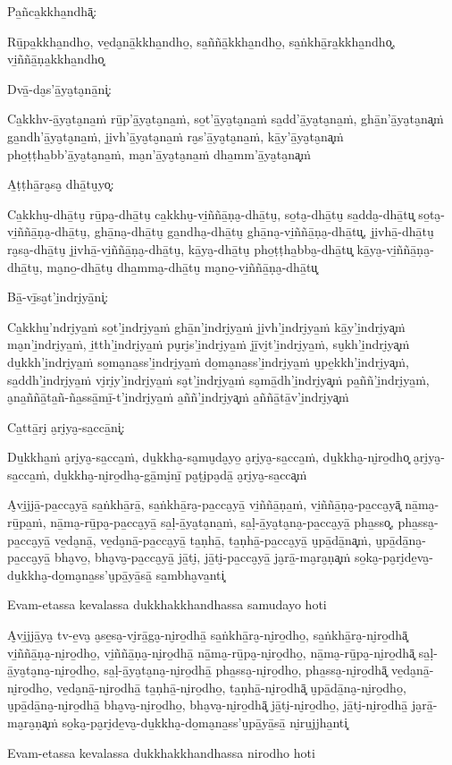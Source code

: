 \begin{paritta}

Pa̱ñca̱kkha̱ndhā͓:

Rū̱pa̱kkha̱ndho̱, ve̱da̮nā̱kkha̱ndho̱, sa̱ññā̱kkha̱ndho̱, sa̱ṅkhā̱ra̱kkha̱ndho͓,
vi̱ññā̱ṇa̱kkha̱ndho͓

Dvā̱-da̮s'ā̱ya̮ta̮nā̱ni͓:

Ca̱kkhv-ā̱ya̮ta̮na̱ṁ rū̱p'ā̱ya̮ta̮na̱ṁ, so̱t'ā̱ya̮ta̮na̱ṁ sa̱dd'ā̱ya̮ta̮na̱ṁ, ghā̱n'ā̱ya̮ta̮na͓ṁ
ga̱ndh'ā̱ya̮ta̮na̱ṁ, ji̱vh'ā̱ya̮ta̮na̱ṁ ra̮s'ā̱ya̮ta̮na̱ṁ, kā̱y'ā̱ya̮ta̮na͓ṁ
pho̱ṭṭha̱bb'ā̱ya̮ta̮na̱ṁ, ma̮n'ā̱ya̮ta̮na̱ṁ dha̱mm'ā̱ya̮ta̮na͓ṁ

A̱ṭṭhā̱ra̮sa̮ dhā̱tu̮yo͓:

Ca̱kkhu̮-dhā̱tu̮ rū̱pa̮-dhā̱tu̮ ca̱kkhu̮-vi̱ññā̱ṇa̮-dhā̱tu̮, so̱ta̮-dhā̱tu̮ sa̱dda̮-dhā̱tu͓
so̱ta̮-vi̱ññā̱ṇa̮-dhā̱tu̮, ghā̱na̮-dhā̱tu̮ ga̱ndha̮-dhā̱tu̮ ghā̱na̮-vi̱ññā̱ṇa̮-dhā̱tu͓,
ji̱vhā̱-dhā̱tu̮ ra̮sa̮-dhā̱tu̮ ji̱vhā̱-vi̱ññā̱ṇa̮-dhā̱tu̮, kā̱ya̮-dhā̱tu̮ pho̱ṭṭha̱bba̮-dhā̱tu͓
kā̱ya̮-vi̱ññā̱ṇa̮-dhā̱tu̮, ma̮no̱-dhā̱tu̮ dha̱mma̮-dhā̱tu̮ ma̮no̱-vi̱ññā̱ṇa̮-dhā̱tu͓

Bā̱-vī̱sa̮t'i̱ndri̮yā̱ni͓:

Ca̱kkhu̱'ndri̮ya̱ṁ so̱t'i̱ndri̮ya̱ṁ ghā̱n'i̱ndri̮ya̱ṁ ji̱vh'i̱ndri̮ya̱ṁ kā̱y'i̱ndri̮ya͓ṁ
ma̮n'i̱ndri̮ya̱ṁ, i̱tth'i̱ndri̮ya̱ṁ pu̮ri̮s'i̱ndri̮ya̱ṁ jī̱vi̮t'i̱ndri̮ya̱ṁ, su̮kh'i̱ndri̮ya͓ṁ
du̱kkh'i̱ndri̮ya̱ṁ so̱ma̮na̱ss'i̱ndri̮ya̱ṁ do̱ma̮na̱ss'i̱ndri̮ya̱ṁ u̮pe̱kkh'i̱ndri̮ya͓ṁ,
sa̱ddh'i̱ndri̮ya̱ṁ vi̮ri̮y'i̱ndri̮ya̱ṁ sa̮t'i̱ndri̮ya̱ṁ sa̮mā̱dh'i̱ndri̮ya͓ṁ
pa̱ññ'i̱ndri̮ya̱ṁ, a̮na̱ññā̱ta̱ñ-ña̱ssā̱mī̱-t'i̱ndri̮ya̱ṁ a̱ññ'i̱ndri̮ya͓ṁ
a̱ññā̱tā̱v'i̱ndri̮ya͓ṁ

Ca̱ttā̱ri̮ a̮ri̮ya̮-sa̱ccā̱ni͓:

Du̱kkha̱ṁ a̮ri̮ya̮-sa̱cca̱ṁ, du̱kkha̮-sa̮mu̮da̮yo̱ a̮ri̮ya̮-sa̱cca̱ṁ, du̱kkha̮-ni̮ro̱dho͓
a̮ri̮ya̮-sa̱cca̱ṁ, du̱kkha̮-ni̮ro̱dha̮-gā̱mi̮nī̱ pa̮ṭi̮pa̮dā̱ a̮ri̮ya̮-sa̱cca͓ṁ

A̮vi̱jjā̱-pa̱cca̮yā̱ sa̱ṅkhā̱rā̱, sa̱ṅkhā̱ra̮-pa̱cca̮yā̱ vi̱ññā̱ṇa̱ṁ, vi̱ññā̱ṇa̮-pa̱cca̮yā͓
nā̱ma̮-rū̱pa̱ṁ, nā̱ma̮-rū̱pa̮-pa̱cca̮yā̱ sa̱ḷ-ā̱ya̮ta̮na̱ṁ, sa̱ḷ-ā̱ya̮ta̮na̮-pa̱cca̮yā̱ pha̱sso͓,
pha̱ssa̮-pa̱cca̮yā̱ ve̱da̮nā̱, ve̱da̮nā̱-pa̱cca̮yā̱ ta̱ṇhā̱, ta̱ṇhā̱-pa̱cca̮yā̱ u̮pā̱dā̱na͓ṁ,
u̮pā̱dā̱na̮-pa̱cca̮yā̱ bha̮vo̱, bha̮va̮-pa̱cca̮yā̱ jā̱ti̮, jā̱ti̮-pa̱cca̮yā̱ ja̮rā̱-ma̮ra̮ṇa͓ṁ
so̱ka̮-pa̮ri̮de̱va̮-du̱kkha̮-do̱ma̮na̱ss'u̮pā̱yā̱sā̱ sa̱mbha̮va̱nti͓

Evam-etassa kevalassa dukkhakkhandhassa samudayo hoti

A̮vi̱jjā̱ya̮ tv-e̱va̮ a̮se̱sa̮-vi̮rā̱ga̮-ni̮ro̱dhā̱ sa̱ṅkhā̱ra̮-ni̮ro̱dho̱, sa̱ṅkhā̱ra̮-ni̮ro̱dhā͓
vi̱ññā̱ṇa̮-ni̮ro̱dho̱, vi̱ññā̱ṇa̮-ni̮ro̱dhā̱ nā̱ma̮-rū̱pa̮-ni̮ro̱dho̱, nā̱ma̮-rū̱pa̮-ni̮ro̱dhā͓
sa̱ḷ-ā̱ya̮ta̮na̮-ni̮ro̱dho̱, sa̱ḷ-ā̱ya̮ta̮na̮-ni̮ro̱dhā̱ pha̱ssa̮-ni̮ro̱dho̱, pha̱ssa̮-ni̮ro̱dhā͓
ve̱da̮nā̱-ni̮ro̱dho̱, ve̱da̮nā̱-ni̮ro̱dhā̱ ta̱ṇhā̱-ni̮ro̱dho̱, ta̱ṇhā̱-ni̮ro̱dhā͓
u̮pā̱dā̱na̮-ni̮ro̱dho̱, u̮pā̱dā̱na̮-ni̮ro̱dhā̱ bha̮va̮-ni̮ro̱dho̱, bha̮va̮-ni̮ro̱dhā͓
jā̱ti̮-ni̮ro̱dho̱, jā̱ti̮-ni̮ro̱dhā̱ ja̮rā̱-ma̮ra̮ṇa͓ṁ
so̱ka̮-pa̮ri̮de̱va̮-du̱kkha̮-do̱ma̮na̱ss'u̮pā̱yā̱sā̱ ni̮ru̱jjha̱nti͓

Evam-etassa kevalassa dukkhakkhandhassa nirodho hoti

\end{paritta}

